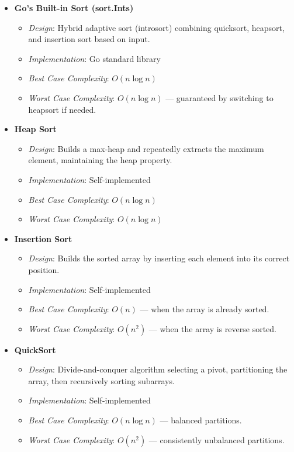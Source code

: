 \documentclass[11pt,a4paper]{article}
\begin{document}
\begin{itemize}
	\item \textbf{Go's Built-in Sort (sort.Ints)}
	      \begin{itemize}
		      \item \textit{Design}: Hybrid adaptive sort (introsort) combining quicksort, heapsort, and insertion sort based on input.
		      \item \textit{Implementation}: Go standard library
		      \item \textit{Best Case Complexity}: \(O(n \log n)\)
		      \item \textit{Worst Case Complexity}: \(O(n \log n)\) — guaranteed by switching to heapsort if needed.
	      \end{itemize}

	\item \textbf{Heap Sort}
	      \begin{itemize}
		      \item \textit{Design}: Builds a max-heap and repeatedly extracts the maximum element, maintaining the heap property.
		      \item \textit{Implementation}: Self-implemented
		      \item \textit{Best Case Complexity}: \(O(n \log n)\)
		      \item \textit{Worst Case Complexity}: \(O(n \log n)\)
	      \end{itemize}

	\item \textbf{Insertion Sort}
	      \begin{itemize}
		      \item \textit{Design}: Builds the sorted array by inserting each element into its correct position.
		      \item \textit{Implementation}: Self-implemented
		      \item \textit{Best Case Complexity}: \(O(n)\) — when the array is already sorted.
		      \item \textit{Worst Case Complexity}: \(O(n^2)\) — when the array is reverse sorted.
	      \end{itemize}

	\item \textbf{QuickSort}
	      \begin{itemize}
		      \item \textit{Design}: Divide-and-conquer algorithm selecting a pivot, partitioning the array, then recursively sorting subarrays.
		      \item \textit{Implementation}: Self-implemented
		      \item \textit{Best Case Complexity}: \(O(n \log n)\) — balanced partitions.
		      \item \textit{Worst Case Complexity}: \(O(n^2)\) — consistently unbalanced partitions.
	      \end{itemize}


\end{itemize}
\end{document}
